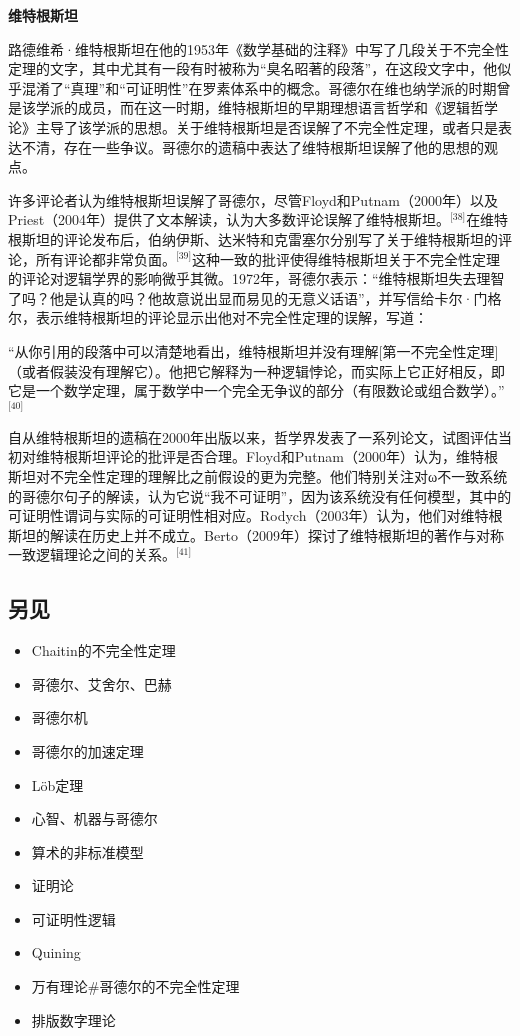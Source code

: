 \textbf{维特根斯坦} 

路德维希·维特根斯坦在他的1953年《数学基础的注释》中写了几段关于不完全性定理的文字，其中尤其有一段有时被称为“臭名昭著的段落”，在这段文字中，他似乎混淆了“真理”和“可证明性”在罗素体系中的概念。哥德尔在维也纳学派的时期曾是该学派的成员，而在这一时期，维特根斯坦的早期理想语言哲学和《逻辑哲学论》主导了该学派的思想。关于维特根斯坦是否误解了不完全性定理，或者只是表达不清，存在一些争议。哥德尔的遗稿中表达了维特根斯坦误解了他的思想的观点。

许多评论者认为维特根斯坦误解了哥德尔，尽管Floyd和Putnam（2000年）以及Priest（2004年）提供了文本解读，认为大多数评论误解了维特根斯坦。\(^\text{[38]}\)在维特根斯坦的评论发布后，伯纳伊斯、达米特和克雷塞尔分别写了关于维特根斯坦的评论，所有评论都非常负面。\(^\text{[39]}\)这种一致的批评使得维特根斯坦关于不完全性定理的评论对逻辑学界的影响微乎其微。1972年，哥德尔表示：“维特根斯坦失去理智了吗？他是认真的吗？他故意说出显而易见的无意义话语”，并写信给卡尔·门格尔，表示维特根斯坦的评论显示出他对不完全性定理的误解，写道：

“从你引用的段落中可以清楚地看出，维特根斯坦并没有理解[第一不完全性定理]（或者假装没有理解它）。他把它解释为一种逻辑悖论，而实际上它正好相反，即它是一个数学定理，属于数学中一个完全无争议的部分（有限数论或组合数学）。”\(^\text{[40]}\)

自从维特根斯坦的遗稿在2000年出版以来，哲学界发表了一系列论文，试图评估当初对维特根斯坦评论的批评是否合理。Floyd和Putnam（2000年）认为，维特根斯坦对不完全性定理的理解比之前假设的更为完整。他们特别关注对ω不一致系统的哥德尔句子的解读，认为它说“我不可证明”，因为该系统没有任何模型，其中的可证明性谓词与实际的可证明性相对应。Rodych（2003年）认为，他们对维特根斯坦的解读在历史上并不成立。Berto（2009年）探讨了维特根斯坦的著作与对称一致逻辑理论之间的关系。\(^\text{[41]}\)
\subsection{另见}
\begin{itemize}
\item Chaitin的不完全性定理 
\item 哥德尔、艾舍尔、巴赫  
\item 哥德尔机 
\item 哥德尔的加速定理 
\item Löb定理  
\item 心智、机器与哥德尔 
\item 算术的非标准模型 
\item 证明论  
\item 可证明性逻辑  
\item Quining  
\item 万有理论#哥德尔的不完全性定理 
\item 排版数字理论
\end{itemize}
